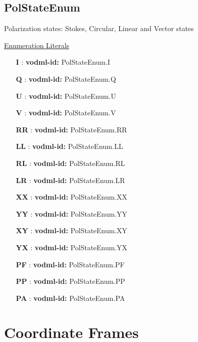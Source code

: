   \subsection{PolStateEnum}
  \label{sect:PolStateEnum}

  Polarization states: Stokes, Circular, Linear and Vector states

  \noindent \underline{Enumeration Literals}
  \vspace{-\parsep}
  \small
  \begin{itemize}
  
    \item[\textbf{I}]: \textbf{vodml-id:} PolStateEnum.I 
    \item[\textbf{Q}]: \textbf{vodml-id:} PolStateEnum.Q 
    \item[\textbf{U}]: \textbf{vodml-id:} PolStateEnum.U 
    \item[\textbf{V}]: \textbf{vodml-id:} PolStateEnum.V 
    \item[\textbf{RR}]: \textbf{vodml-id:} PolStateEnum.RR 
    \item[\textbf{LL}]: \textbf{vodml-id:} PolStateEnum.LL 
    \item[\textbf{RL}]: \textbf{vodml-id:} PolStateEnum.RL 
    \item[\textbf{LR}]: \textbf{vodml-id:} PolStateEnum.LR 
    \item[\textbf{XX}]: \textbf{vodml-id:} PolStateEnum.XX 
    \item[\textbf{YY}]: \textbf{vodml-id:} PolStateEnum.YY 
    \item[\textbf{XY}]: \textbf{vodml-id:} PolStateEnum.XY 
    \item[\textbf{YX}]: \textbf{vodml-id:} PolStateEnum.YX 
    \item[\textbf{PF}]: \textbf{vodml-id:} PolStateEnum.PF 
    \item[\textbf{PP}]: \textbf{vodml-id:} PolStateEnum.PP 
    \item[\textbf{PA}]: \textbf{vodml-id:} PolStateEnum.PA 
  \end{itemize}
  \normalsize


\pagebreak
\section{Coordinate Frames}

